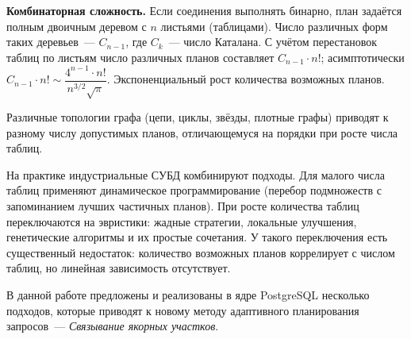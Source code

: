 \textbf{Комбинаторная сложность.}
Если соединения выполнять бинарно, план задаётся полным двоичным деревом
с $n$ листьями (таблицами). Число различных форм таких деревьев~---
$C_{n-1}$, где $C_k$~--- число Каталана.
С учётом перестановок таблиц по листьям число различных планов
составляет $C_{n-1} \cdot n!$; асимптотически
$C_{n-1} \cdot n! \sim \dfrac{4^{n-1} \cdot n!}{n^{3/2}\sqrt{\pi}}$.
Экспоненциальный рост количества возможных планов.
\par

Различные топологии графа (цепи, циклы, звёзды,
плотные графы) приводят к разному числу допустимых планов, отличающемуся
на порядки при росте числа таблиц.
\par

На практике индустриальные СУБД комбинируют подходы. Для малого числа таблиц применяют динамическое программирование (перебор 
подмножеств с запоминанием лучших частичных планов). При росте количества таблиц переключаются на эвристики: жадные 
стратегии, локальные улучшения, генетические алгоритмы и их простые сочетания. У такого переключения есть существенный недостаток: 
количество возможных планов коррелирует с числом таблиц, но линейная зависимость отсутствует.
\par

В данной работе предложены и реализованы в ядре PostgreSQL несколько подходов, которые 
приводят к новому методу адаптивного планирования запросов~--- \emph{Связывание якорных участков}.
\par